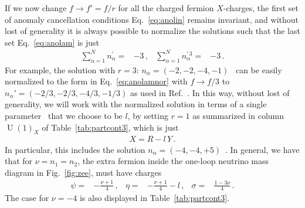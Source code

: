 \documentclass[12pt]{article}
\begin{document}
If we now change $f\to f'= f/r$ for all the charged fermion $X$-charges, the
first set of anomaly cancellation conditions Eq.~\eqref{eq:anolin} remains
invariant, and without lost of generality it is always possible to
normalize the solutions such that the last set Eq.~\eqref{eq:anolam} is
just
\begin{align}
  \label{eq:anolamnor}
   \sum_{\alpha=1}^{N} n_{\alpha}^{\prime}=&-3\,,   & \sum_{\alpha=1}^{N} n_{\alpha}^{\prime\, 3}=&-3\,.
\end{align}
For example, the solution with $r=3$: $n_{\alpha}=\left( -2,-2,-4,-1 \right)$~\cite{Appelquist:2002mw} can be easily normalized to the form in Eq.~\eqref{eq:anolamnor} with $f\to f/3$
to $n_{\alpha}'=\left( -2/3,-2/3,-4/3,-1/3 \right)$
as used in Ref.~\cite{Patra:2016ofq}. In this way, without lost of generality, we will work with the normalized solution in terms of a single parameter~\cite{Jenkins:1987ue,Oda:2015gna,Okada:2018tgy} that we choose to be $l$, by setting $r=1$ as summarized in column $\operatorname{U}(1)_X$ of Table~\ref{tab:partcont3}, which is just
\begin{align}
  X=R-l\, Y\,.
\end{align}
In particular, this includes the solution  $n_{\alpha}=(-4,-4,+5)$~\cite{Appelquist:2002mw}. 
In general, we have that for $\nu=n_1=n_2$, the extra fermion inside the one-loop neutrino mass diagram in Fig.~\ref{fig:zee}, must have charges
\begin{align}
  \psi=&-\frac{\nu+1}{4}\,,&\eta=&-\frac{\nu+1}{4}-l\,,&\sigma=&\frac{1-3\nu}{4}\,.
\end{align}
The case for $\nu=-4$ is also displayed in Table~\ref{tab:partcont3}.

%
%
%

%

\end{document}
